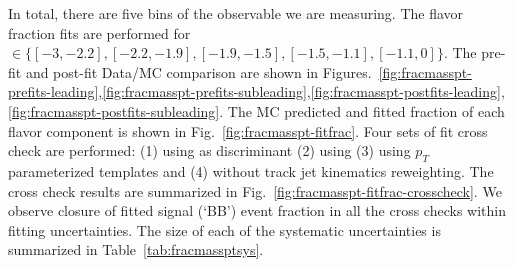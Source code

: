 In total, there are five bins of the \mpt observable we are measuring. The flavor fraction fits are performed for \mpt $\in\{[-3, -2.2], [-2.2, -1.9], [-1.9, -1.5], [-1.5, -1.1], [-1.1,0]\}$. The pre-fit and post-fit Data/MC comparison are shown in Figures.~\ref{fig:fracmasspt-prefits-leading},\ref{fig:fracmasspt-prefits-subleading},\ref{fig:fracmasspt-postfits-leading},\ref{fig:fracmasspt-postfits-subleading}. The MC predicted and fitted fraction of each flavor component is shown in Fig.~\ref{fig:fracmasspt-fitfrac}. Four sets of fit cross check are performed: (1) using \sdzero as discriminant (2) using \subsubsdzero (3) using $p_T$ parameterized templates and (4) without track jet kinematics reweighting. The cross check results are summarized in Fig.~\ref{fig:fracmasspt-fitfrac-crosscheck}. We observe closure of fitted signal (`BB') event fraction in all the cross checks within fitting uncertainties. The size of each of the systematic uncertainties is summarized in Table~\ref{tab:fracmassptsys}.


